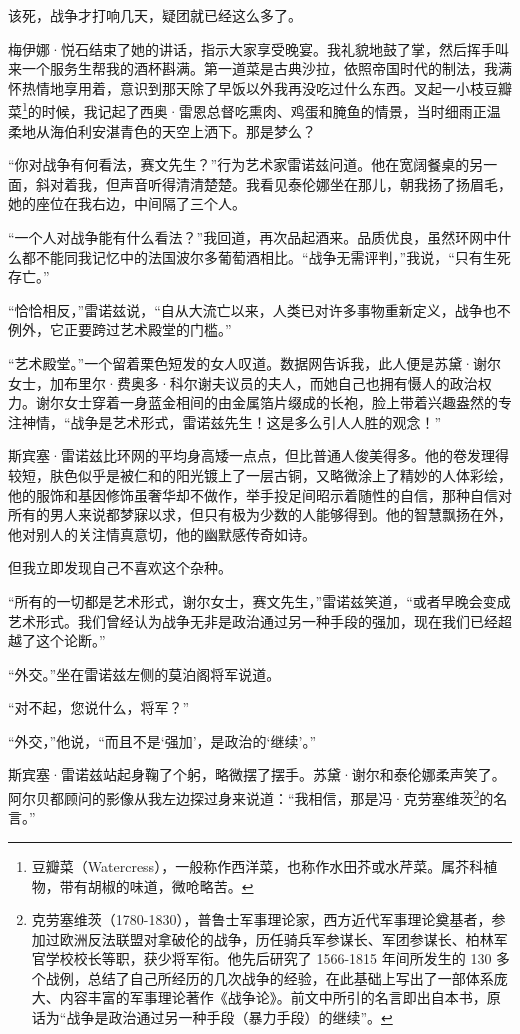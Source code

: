 \documentclass[AutoFakeBold=true]{book}
\begin{document}
该死，战争才打响几天，疑团就已经这么多了。

梅伊娜·悦石结束了她的讲话，指示大家享受晚宴。我礼貌地鼓了掌，然后挥手叫来一个服务生帮我的酒杯斟满。第一道菜是古典沙拉，依照帝国时代的制法，我满怀热情地享用着，意识到那天除了早饭以外我再没吃过什么东西。叉起一小枝豆瓣菜\footnote{豆瓣菜（Watercress），一般称作西洋菜，也称作水田芥或水芹菜。属芥科植物，带有胡椒的味道，微呛略苦。}的时候，我记起了西奥·雷恩总督吃熏肉、鸡蛋和腌鱼的情景，当时细雨正温柔地从海伯利安湛青色的天空上洒下。{\kaishu 那是梦么？}

``你对战争有何看法，赛文先生？''行为艺术家雷诺兹问道。他在宽阔餐桌的另一面，斜对着我，但声音听得清清楚楚。我看见泰伦娜坐在那儿，朝我扬了扬眉毛，她的座位在我右边，中间隔了三个人。

``一个人对战争能有什么看法？''我回道，再次品起酒来。品质优良，虽然环网中什么都不能同我记忆中的法国波尔多葡萄酒相比。``战争无需评判，''我说，``只有生死存亡。''

``恰恰相反，''雷诺兹说，``自从大流亡以来，人类已对许多事物重新定义，战争也不例外，它正要跨过艺术殿堂的门槛。''

``艺术殿堂。''一个留着栗色短发的女人叹道。数据网告诉我，此人便是苏黛·谢尔女士，加布里尔·费奥多·科尔谢夫议员的夫人，而她自己也拥有慑人的政治权力。谢尔女士穿着一身蓝金相间的由金属箔片缀成的长袍，脸上带着兴趣盎然的专注神情，``战争是艺术形式，雷诺兹先生！这是多么引人人胜的观念！''

斯宾塞·雷诺兹比环网的平均身高矮一点点，但比普通人俊美得多。他的卷发理得较短，肤色似乎是被仁和的阳光镀上了一层古铜，又略微涂上了精妙的人体彩绘，他的服饰和基因修饰虽奢华却不做作，举手投足间昭示着随性的自信，那种自信对所有的男人来说都梦寐以求，但只有极为少数的人能够得到。他的智慧飘扬在外，他对别人的关注情真意切，他的幽默感传奇如诗。

但我立即发现自己不喜欢这个杂种。

``{\kaishu 所有的一切}都是艺术形式，谢尔女士，赛文先生，''雷诺兹笑道，``或者早晚会变成艺术形式。我们曾经认为战争无非是政治通过另一种手段的强加，现在我们已经超越了这个论断。''

``外交。''坐在雷诺兹左侧的莫泊阁将军说道。

``对不起，您说什么，将军？''

``外交，''他说，``而且不是`强加'，是政治的`继续'。''

斯宾塞·雷诺兹站起身鞠了个躬，略微摆了摆手。苏黛·谢尔和泰伦娜柔声笑了。阿尔贝都顾问的影像从我左边探过身来说道：``我相信，那是冯·克劳塞维茨\footnote{克劳塞维茨（1780-1830），普鲁士军事理论家，西方近代军事理论奠基者，参加过欧洲反法联盟对拿破伦的战争，历任骑兵军参谋长、军团参谋长、柏林军官学校校长等职，获少将军衔。他先后研究了 1566-1815 年间所发生的 130 多个战例，总结了自己所经历的几次战争的经验，在此基础上写出了一部体系庞大、内容丰富的军事理论著作《战争论》。前文中所引的名言即出自本书，原话为``战争是政治通过另一种手段（暴力手段）的继续''。}的名言。''
\end{document}
